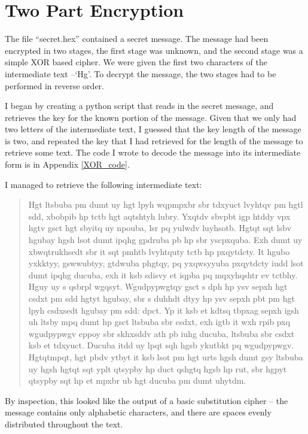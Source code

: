 \documentclass[11pt,a4paper,twoside]{article}
\begin{document}
\vfill
\pagebreak
\section{Two Part Encryption}
The file ``secret.hex'' contained a secret message. The message had been
encrypted in two stages, the first stage was unknown, and the second stage was
a simple XOR based cipher. We were given the first two characters of the
intermediate text --`Hg'. To decrypt the message, the two stages had to be
performed in reverse order.

I began by creating a python script that reads in the secret message, and
retrieves the key for the known portion of the message. Given that we only
had two letters of the intermediate text, I guessed that the key length of the
message is two, and repeated the key that I had retrieved for the length of
the message to retrieve some text. The code I wrote to decode the
message into its intermediate form is in Appendix \ref{XOR_code}.


I managed to retrieve the following intermediate text: 

\begin{quote}
\small
\raggedright
Hgt ltsbuba pm dumt uy hgt lpyh wqpmpxbr sbr tdxyuct lvyhtqv pm hgtl sdd,
xbobpib hp tctb hgt aqtshtyh lubry.  Yxqtdv sbvpbt igp htddy vpx hgtv gsct hgt
sbyitq uy npouba, lsr pq yulwdv luyhsotb.  Hgtqt sqt lsbv hgubay hgsh lsot dumt
ipqhg gpdruba pb hp sbr yscpxquba. Exh dumt uy xbwqtrukhsedt sbr it sqt pmhtb
lvyhtquty tctb hp pxqytdcty.  It hgubo yxkktyy, gswwubtyy, gtdwuba phgtqy, pq
yxqwsyyuba pxqytdcty iudd lsot dumt ipqhg ducuba, exh it ksb sdisvy et iqpba pq
mqxyhqshtr ev tctbhy. Hguy uy s qsbrpl wgqsyt.  Wgudpypwgtqy gsct s dph hp ysv
sepxh hgt csdxt pm sdd hgtyt hgubay, sbr s duhhdt dtyy hp ysv sepxh pbt pm hgt
lpyh csdxsedt hgubay pm sdd: dpct. Yp it ksb et kdtsq tbpxag sepxh igsh uh
ltsby mpq dumt hp gsct ltsbuba sbr csdxt, exh igtb it wxh rpib pxq wgudpypwgv
eppoy sbr skhxsddv ath pb iuhg ducuba, ltsbuba sbr csdxt ksb et tdxyuct. Ducuba
itdd uy lpqt sqh hgsb ykutbkt pq wgudpypwgv.  Hgtqtmpqt,  hgt pbdv ytbyt it ksb
lsot pm hgt urts hgsh dumt gsy ltsbuba uy hgsh hgtqt sqt yplt qtsypby hp duct
qshgtq hgsb hp rut, sbr hgpyt qtsypby sqt hp et mpxbr ub hgt ducuba pm dumt
uhytdm.
\end{quote}

By inspection, this looked like the output of a basic substitution cipher --
the message contains only alphabetic characters, and there are spaces evenly
distributed throughout the text.
\end{document}
